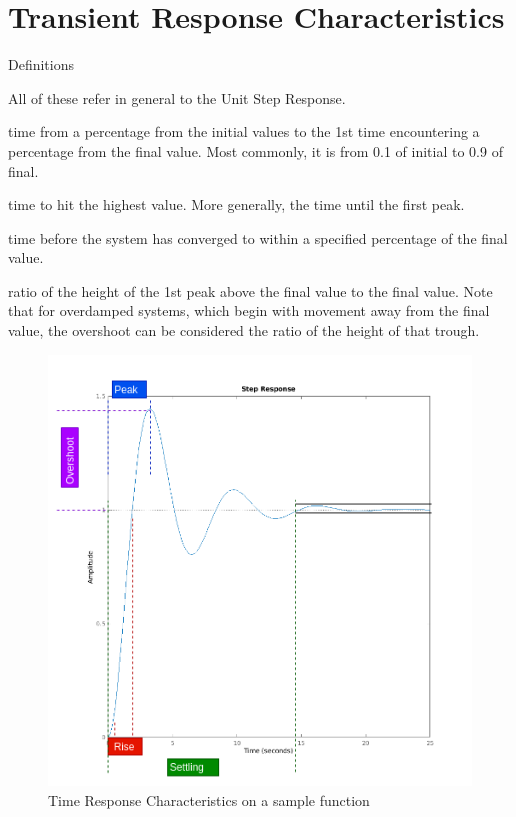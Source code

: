 \documentclass{../templates/topic}
\begin{document}
\graphicspath{{assets/}{ch3a_Time_Domain_Performance_Characteristics/assets/}}

\chapter{Transient Response Characteristics}

\begin{section}{Definitions}
	
	All of these refer in general to the Unit Step Response.
	
	  time from a percentage from the initial values to the 1st time encountering a percentage from the final value. Most commonly, it is from 0.1 of initial to 0.9 of final.
	
	  time to hit the highest value. More generally, the time until the first peak.
	
	  time before the system has converged to within a specified percentage of the final value.
	
	 ratio of the height of the 1st peak above the final value to the final value. Note that for overdamped systems, which begin with movement away from the final value, the overshoot can be considered the ratio of the height of that trough.
	
	\begin{figure}[H]
		\includegraphics[width=\textwidth]{characteristics_on_graph.png}
		\caption{Time Response Characteristics on a sample function}
	\end{figure}
	
\end{section}
\end{document}
